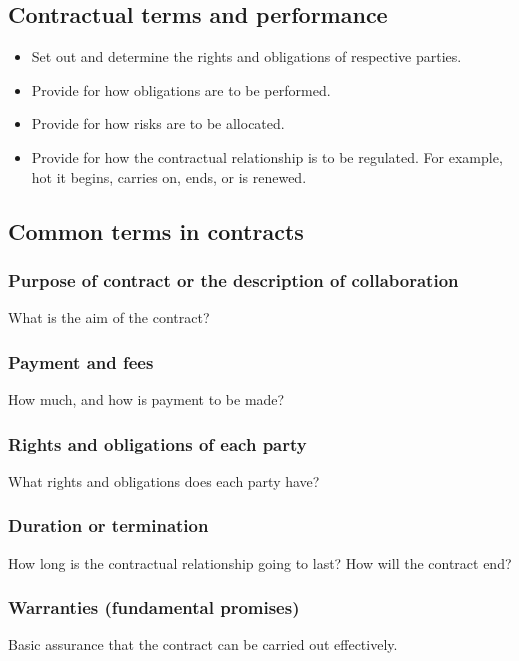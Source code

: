 \documentclass[11pt]{article}
\begin{document}
\subsection{Contractual terms and performance}
\label{sec:orgd66dd72}
\begin{itemize}
\item Set out and determine the rights and obligations of respective parties.
\item Provide for how obligations are to be performed.
\item Provide for how risks are to be allocated.
\item Provide for how the contractual relationship is to be regulated. For example, hot it begins, carries on, ends, or is renewed.
\end{itemize}

\subsection{Common terms in contracts}
\label{sec:org38b45d4}

\subsubsection{Purpose of contract or the description of collaboration}
\label{sec:orgc55ca8f}
What is the aim of the contract?

\subsubsection{Payment and fees}
\label{sec:orga7101d5}
How much, and how is payment to be made?

\subsubsection{Rights and obligations of each party}
\label{sec:org4235565}
What rights and obligations does each party have?

\subsubsection{Duration or termination}
\label{sec:org46525ca}
How long is the contractual relationship going to last? How will the contract end?

\subsubsection{Warranties (fundamental promises)}
\label{sec:org703b093}
Basic assurance that the contract can be carried out effectively.
\end{document}
